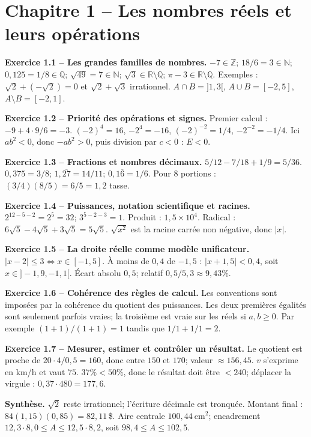 \documentclass[11pt,a4paper,openany]{book}
\newcommand{\R}{\mathbb{R}}\newcommand{\N}{\mathbb{N}}\newcommand{\Z}{\mathbb{Z}}\newcommand{\Q}{\mathbb{Q}}
\begin{document}
\chapter*{Chapitre 1 -- Les nombres réels et leurs opérations}
\begin{answerbox}
\textbf{Exercice 1.1 -- Les grandes familles de nombres.} $-7\in\Z$; $18/6=3\in\N$; $0{,}125=1/8\in\Q$; $\sqrt{49}=7\in\N$; $\sqrt3\in\R\setminus\Q$; $\pi-3\in\R\setminus\Q$. Exemples : $\sqrt2+(-\sqrt2)=0$ et $\sqrt2+\sqrt3$ irrationnel. $A\cap B=]1,3[$, $A\cup B=[-2,5]$, $A\setminus B=[-2,1]$.\par
\textbf{Exercice 1.2 -- Priorité des opérations et signes.} Premier calcul : $-9+4\cdot9/6=-3$. $(-2)^4=16$, $-2^4=-16$, $(-2)^{-2}=1/4$, $-2^{-2}=-1/4$. Ici $ab^2<0$, donc $-ab^2>0$, puis division par $c<0$ : $E<0$.\par
\textbf{Exercice 1.3 -- Fractions et nombres décimaux.} $5/12-7/18+1/9=5/36$. $0{,}375=3/8$; $1{,}\overline{27}=14/11$; $0{,}1\overline6=1/6$. Pour $8$ portions : $(3/4)(8/5)=6/5=1{,}2$ tasse.\par
\textbf{Exercice 1.4 -- Puissances, notation scientifique et racines.} $2^{12-5-2}=2^5=32$; $3^{5-2-3}=1$. Produit : $1{,}5\times10^4$. Radical : $6\sqrt5-4\sqrt5+3\sqrt5=5\sqrt5$. $\sqrt{x^2}$ est la racine carrée non négative, donc $|x|$.\par
\textbf{Exercice 1.5 -- La droite réelle comme modèle unificateur.} $|x-2|\le3\iff x\in[-1,5]$. À moins de $0{,}4$ de $-1{,}5$ : $|x+1{,}5|<0{,}4$, soit $x\in]-1{,}9,-1{,}1[$. Écart absolu $0{,}5$; relatif $0{,}5/5{,}3\approx9{,}43\%$.\par
\textbf{Exercice 1.6 -- Cohérence des règles de calcul.} Les conventions sont imposées par la cohérence du quotient des puissances. Les deux premières égalités sont seulement parfois vraies; la troisième est vraie sur les réels si $a,b\ge0$. Par exemple $(1+1)/(1+1)=1$ tandis que $1/1+1/1=2$.\par
\textbf{Exercice 1.7 -- Mesurer, estimer et contrôler un résultat.} Le quotient est proche de $20\cdot4/0{,}5=160$, donc entre $150$ et $170$; valeur $\approx156{,}45$. $v$ s'exprime en km/h et vaut $75$. $37\%<50\%$, donc le résultat doit être $<240$; déplacer la virgule : $0{,}37\cdot480=177{,}6$.\par
\medskip\textbf{Synthèse.} $\sqrt2$ reste irrationnel; l'écriture décimale est tronquée. Montant final : $84(1{,}15)(0{,}85)=82{,}11\,$\$. Aire centrale $100{,}44\ \mathrm{cm}^2$; encadrement $12{,}3\cdot8{,}0\le A\le12{,}5\cdot8{,}2$, soit $98{,}4\le A\le102{,}5$.
\end{answerbox}
\end{document}
